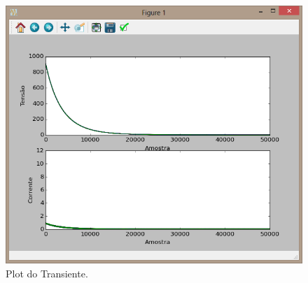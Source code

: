 \documentclass[a4paper, 10pt]{article}
\begin{document}
\begin{figure}[H]
        \caption{\label{fig_plt_transiente}Plot do Transiente.}
	    \begin{center}
            \includegraphics[scale=0.4]{../fotos/execucao/plot_transiente.png}
	    \end{center}
\end{figure}
\end{document}
